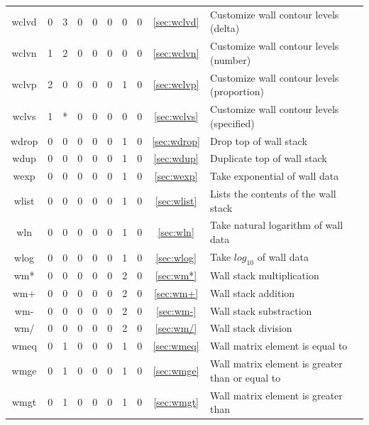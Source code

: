 \documentclass[a4paper,10pt]{report}
\begin{document}
\begin{center}
\begin{longtable}{|c|c|c|c|c|c|c|c|c|l|}
    wclvd \index{b2plot, wclvd}   & 0 & 3 & 0 & 0 & 0 & 0 & 0 & \ref{sec:wclvd}    & Customize wall contour levels (delta) \\
    wclvn \index{b2plot, wclvn}   & 1 & 2 & 0 & 0 & 0 & 0 & 0 & \ref{sec:wclvn}    & Customize wall contour levels (number) \\
    wclvp \index{b2plot, wclvp}   & 2 & 0 & 0 & 0 & 0 & 1 & 0 & \ref{sec:wclvp}    & Customize wall contour levels (proportion) \\
    wclvs \index{b2plot, wclvs}   & 1 & * & 0 & 0 & 0 & 0 & 0 & \ref{sec:wclvs}    & Customize wall contour levels (specified) \\
    wdrop \index{b2plot, wdrop}   & 0 & 0 & 0 & 0 & 0 & 1 & 0 & \ref{sec:wdrop}    & Drop top of wall stack \\
    wdup \index{b2plot, wdup}     & 0 & 0 & 0 & 0 & 0 & 1 & 0 & \ref{sec:wdup}     & Duplicate top of wall stack \\
    wexp \index{b2plot, wexp}     & 0 & 0 & 0 & 0 & 0 & 1 & 0 & \ref{sec:wexp}     & Take exponential of wall data \\
    wlist \index{b2plot, wlist}   & 0 & 0 & 0 & 0 & 0 & 1 & 0 & \ref{sec:wlist}    & Lists the contents of the wall stack \\
    wln \index{b2plot, wln}       & 0 & 0 & 0 & 0 & 0 & 1 & 0 & \ref{sec:wln}      & Take natural logarithm of wall data \\
    wlog \index{b2plot, wlog}     & 0 & 0 & 0 & 0 & 0 & 1 & 0 & \ref{sec:wlog}     & Take $log_{10}$ of wall data \\
    wm* \index{b2plot, wm*}       & 0 & 0 & 0 & 0 & 0 & 2 & 0 & \ref{sec:wm*}      & Wall stack multiplication \\
    wm+ \index{b2plot, wm+}       & 0 & 0 & 0 & 0 & 0 & 2 & 0 & \ref{sec:wm+}      & Wall stack addition \\
    wm- \index{b2plot, wm-}       & 0 & 0 & 0 & 0 & 0 & 2 & 0 & \ref{sec:wm-}      & Wall stack substraction \\
    wm/ \index{b2plot, wm/}       & 0 & 0 & 0 & 0 & 0 & 2 & 0 & \ref{sec:wm/}      & Wall stack division \\
    wmeq \index{b2plot, wmeq}     & 0 & 1 & 0 & 0 & 0 & 1 & 0 & \ref{sec:wmeq}     & Wall matrix element is equal to \\
    wmge \index{b2plot, wmge}     & 0 & 1 & 0 & 0 & 0 & 1 & 0 & \ref{sec:wmge}     & Wall matrix element is greater than or equal to \\
    wmgt \index{b2plot, wmgt}     & 0 & 1 & 0 & 0 & 0 & 1 & 0 & \ref{sec:wmgt}     & Wall matrix element is greater than \\

\end{longtable}
\end{center}
\end{document}
